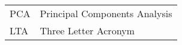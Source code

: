 \begin{longtable}{l p{7cm}}
	PCA & Principal Components Analysis \\
	LTA & Three Letter Acronym
\end{longtable}